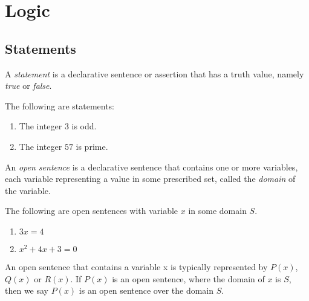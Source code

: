      \section{Logic}
\subsection{Statements}
\begin{defi}[Statement]
     A \emph{statement} is a declarative sentence or assertion that has a truth value, namely \emph{true} or \emph{false}.
\end{defi}
\begin{eg}
     The following are statements:
     \begin{enumerate}[label=(\roman*)]
          \item The integer $3$ is odd.
          \item The integer $57$ is prime.
     \end{enumerate}
\end{eg}
\begin{defi}
    An \emph{open sentence} is a declarative sentence that contains one
    or more variables, each variable representing a value in some prescribed set, called the
    \emph{domain} of the variable.
\end{defi}
\begin{eg}
     The following are open sentences with variable $x$ in some domain $S$.
     \begin{enumerate}
          \item $3x=4$
          \item $x^2+4x+3=0$
     \end{enumerate}
     An open sentence that contains a variable x is typically represented by $P(x)$, $Q(x)$ or
    $R(x)$. If $P(x)$ is an open sentence, where the domain of $x$ is $S$, then we say $P(x)$ is an open
    sentence over the domain $S$.
\end{eg}

